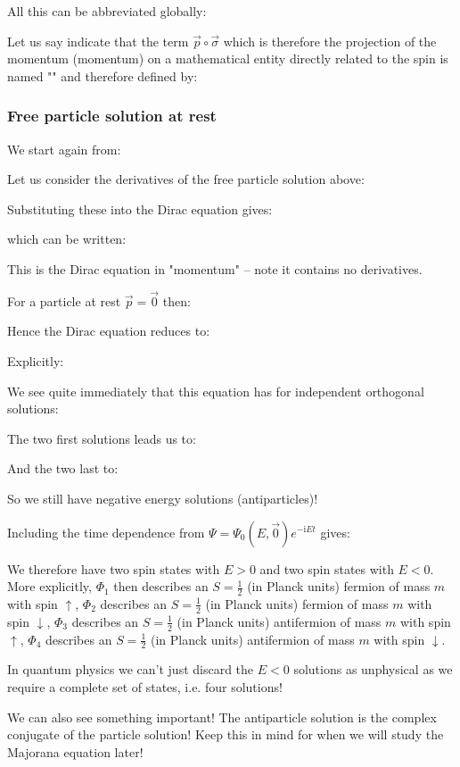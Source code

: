 	All this can be abbreviated globally:
	
	Let us say indicate that the term $\vec{p}\circ\vec{\sigma}$ which is therefore the projection of the momentum (momentum) on a mathematical entity directly related to the spin is named "" and therefore defined by:
	
	
	\subsubsection{Free particle solution at rest}\label{free particle solution at rest}
	We start again from:
		
	Let us consider the derivatives of the free particle solution above:
	
	Substituting these into the Dirac equation gives:
	
	which can be written:
	
	This is the Dirac equation in "momentum" – note it contains no derivatives.
	
	For a particle at rest $\vec{p}=\vec{0}$ then:
	
	Hence the Dirac equation reduces to:
	
	Explicitly:
	
	We see quite immediately that this equation has for independent orthogonal solutions:
	
	The two first solutions leads us to:
	
	And the two last to:
	
	So we still have negative energy solutions (antiparticles)!
	
	Including the time dependence from $\Psi=\Psi_0(E,\vec{0})e^{-\mathrm{i}Et}$ gives:
	
	We therefore have two spin states with $E>0$ and two spin states with $E<0$. More explicitly, $\Phi_1$ then describes an $S=\frac{1}{2}$ (in Planck units) fermion of mass $m$ with spin $\uparrow$, $\Phi_2$ describes an $S=\frac{1}{2}$ (in Planck units) fermion of mass $m$ with spin $\downarrow$, $\Phi_3$ describes an $S=\frac{1}{2}$ (in Planck units) antifermion of mass $m$ with spin $\uparrow$, $\Phi_4$ describes an $S=\frac{1}{2}$ (in Planck units) antifermion of mass $m$ with spin $\downarrow$.
	
	In quantum physics we can't just discard the $E<0$ solutions as unphysical
as we require a complete set of states, i.e. four solutions!
	
	We can also see something important! The antiparticle solution is the complex conjugate of the particle solution! Keep this in mind for when we will study the Majorana equation later!
	

